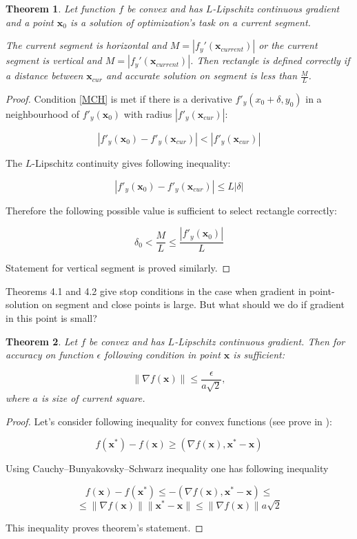\documentclass[12pt]{article}
\newtheorem{theorem}{Theorem}[section]
\begin{document}
\begin{theorem}
\label{CurGrad}
Let function $f$ be convex and has $L$-Lipschitz continuous gradient and a point $\textbf{x}_0$ is a solution of optimization's  task on a current segment. 

The current segment is horizontal and $M = |f_y'(\textbf{x}_{current})|$ or the current segment is vertical and $M = |f_y'(\textbf{x}_{current})|$. Then rectangle is defined correctly if a distance between $\textbf{x}_{cur}$ and accurate solution on segment is less than $\frac{M}{L}$.
\end{theorem}
\begin{proof}
Condition \eqref{MCH} is met if there is a derivative $f'_y(x_0+\delta, y_0)$ in a neighbourhood of 
$f'_y(\textbf{x}_0)$ with radius $\left|f'_y(\textbf{x}_{cur})\right|$:

$$\left|f'_y(\textbf{x}_0) - f'_y(\textbf{x}_{cur})\right|<\left|f'_y(\textbf{x}_{cur})\right|$$

The $L$-Lipschitz continuity gives following inequality:

$$\left|f'_y(\textbf{x}_0) - f'_y(\textbf{x}_{cur})\right| \leq L|\delta|$$

Therefore the following possible value is sufficient to select rectangle correctly:

$$\delta_0 < \frac{M}{L} \leq \frac{\left|f'_y(\textbf{x}_0)\right|}{L}$$

Statement for vertical segment is proved similarly.
\end{proof}

Theorems 4.1 and 4.2 give stop conditions in the case when gradient in point-solution on segment and close points is large. But what should we do if gradient in this point is small?

\begin{theorem}
Let $f$ be convex and has $L$-Lipschitz continuous gradient. Then for accuracy on function $\epsilon$ following condition in point $\textbf{x}$ is sufficient:

$$\|\nabla f(\textbf{x})\|\leq \frac{\epsilon}{a\sqrt{2}}, $$
where $a$ is size of current square.
\end{theorem}

\begin{proof}
Let's consider following inequality for convex functions (see prove in \cite{Nesterov}):

$$f(\textbf{x}^*) - f(\textbf{x}) \geq (\nabla f(\textbf{x}), \textbf{x}^* - \textbf{x} )$$

Using  Cauchy–Bunyakovsky–Schwarz inequality one has following inequality

$$f(\textbf{x}) - f(\textbf{x}^*) \leq -(\nabla f(\textbf{x}), \textbf{x}^* - \textbf{x} )\leq$$
$$\leq \|\nabla f(\textbf{x})\| \|\textbf{x}^* - \textbf{x}\|\leq \|\nabla f(\textbf{x})\|a\sqrt{2}$$

This inequality proves theorem's statement.
\end{proof}
\end{document}
